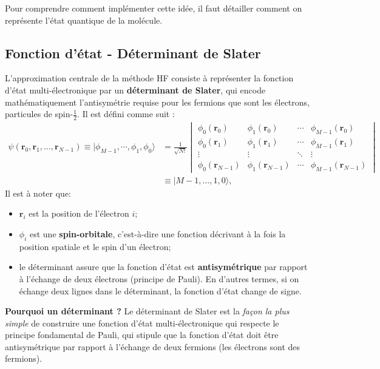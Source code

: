 \documentclass[12pt,a4paper]{article} %
\numberwithin{equation}{section} %
\numberwithin{figure}{section} %
\numberwithin{table}{section} %
\begin{document}
Pour comprendre comment implémenter cette idée, il faut détailler comment on représente l'état quantique de la molécule.

\subsection{Fonction d'état - Déterminant de Slater}

L'approximation centrale de la méthode HF consiste à représenter la fonction d'état multi-électronique par un \textbf{déterminant de Slater}, qui encode mathématiquement l'antisymétrie requise pour les fermions que sont les électrons, particules de spin-$\frac12$. Il est défini comme suit :
\begin{equation}
\begin{split}
\psi(\mathbf{r}_0, \mathbf{r}_1, \ldots, \mathbf{r}_{N-1})\equiv |\phi_{M-1},\cdots,  \phi_1, \phi_0 \rangle 
&=   \frac{1}{\sqrt{N!}}
\begin{vmatrix} \phi_0(\mathbf{r}_0) & \phi_1(\mathbf{r}_0) & \cdots & \phi_{M-1}(\mathbf{r}_0) \\
      \phi_0(\mathbf{r}_1) & \phi_1(\mathbf{r}_1) & \cdots & \phi_{M-1}(\mathbf{r}_1) \\
      \vdots & \vdots & \ddots & \vdots \\
      \phi_0(\mathbf{r}_{N-1}) & \phi_1(\mathbf{r}_{N-1}) & \cdots & \phi_{M-1}(\mathbf{r}_{N-1})
\end{vmatrix} \\
&\equiv |M-1,\dots, 1, 0 \rangle,
\end{split}
\end{equation} 
Il est à noter que:
\begin{itemize}
\item $\mathbf{r}_i$ est la position de l'électron $i$;
\item $\phi_i$ est une \textbf{spin-orbitale}, c'est-à-dire une fonction décrivant à la fois la position spatiale et le spin d'un électron;
\item le déterminant assure que la fonction d'état est \textbf{antisymétrique} par rapport à l'échange de deux électrons (principe de Pauli). En d'autres termes, si on échange deux lignes dans le déterminant, la fonction d'état change de signe.
\end{itemize}

\textbf{Pourquoi un déterminant ?} Le déterminant de Slater est la \textit{façon la plus simple} de construire une fonction d'état multi-électronique qui respecte le principe fondamental de Pauli, qui stipule que la fonction d'état doit être antisymétrique par rapport à l'échange de deux fermions (les électrons sont des fermions).
\end{document}
